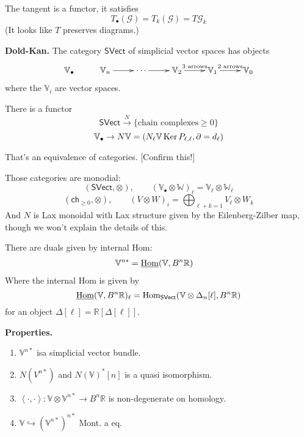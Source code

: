 {\medskip\noindent
The tangent is a functor, it satisfies
$$
T_\bullet(\mathcal{G})=T_k(\mathcal{G})=T\mathcal{G}_k
$$
(It looks like $T$ preserves diagrams.)

\medskip\noindent
{\bf Dold-Kan.} The category $\mathsf{SVect}$ of simplicial vector spaces
has objects
$$
\xymatrix{
\mathbb{V}_\bullet&  \mathbb{V}_n\ar[r]&\cdots
\ar[r]&\mathbb{V}_2\ar[r]^{\text{3 arrows}}&
\mathbb{V}_1\ar[r]^{\text{2 arrows}}&\mathbb{V}_0
}
$$
where the $\mathbb{V}_i$ are vector spaces.

There is a functor
$$
\mathsf{SVect}\overset{N}{\to}\{\text{chain complexes}\geq 0\}
$$
$$
\mathbb{V}_{\bullet}\to N\mathbb{V}=
\left(N_\ell \mathbb{V}\mathop{\mathrm{Ker}} P_{\ell,\ell},\partial=d_\ell\right)
$$

\begin{theorem}
\label{theorem-Dold-Kan}
That's an equivalence of categories. [Confirm this!]
\end{theorem}

Those categories are monodial:
$$
(\mathsf{SVect},\otimes),\qquad  (\mathbb{V}_\bullet \otimes \mathbb{W})_\ell
=\mathbb{V}_\ell \otimes \mathbb{W}_\ell
$$
$$
(\mathsf{ch}_{\geq 0},\otimes),\qquad (V \otimes W)_i=
\bigoplus_{\ell +k=1}V_\ell \otimes W_k
$$
And $N$ is Lax monoidal with Lax structure given by the
Eilenberg-Zilber map, though we won't explain the details of this.

There are duals given by internal Hom:
\begin{align*}
\mathbb{V}^{n*}&=\underline{\mathop{\mathrm{Hom}}\nolimits}(\mathbb{V},B^n\mathbb{R})
\end{align*}
Where the internal Hom is given by
$$
\underline{\mathop{\mathrm{Hom}}\nolimits}(\mathbb{V},B^n\mathbb{R})_\ell
=\mathop{\mathrm{Hom}}\nolimits_{\mathsf{SVect}}(\mathbb{V}\otimes\Delta_n[\ell],B^n\mathbb{R})
$$
for an object $\Delta[\ell]=\mathbb{R}[\Delta[\ell]]$.


\medskip\noindent
{\bf Properties.}
\begin{enumerate}
\item $\mathbb{V}^{n*}$ isa simplicial vector bundle.
\item $N(V^{n*})$ and $N(\mathbb{V})^*[n]$ is a quasi isomorphism.
\item $\left<\cdot,\cdot\right>:\mathbb{V}\otimes \mathbb{V}^{n*}\to
B^n\mathbb{R}$ is non-degenerate on homology.
\item $\mathbb{V}\hookrightarrow (\mathbb{V}^{n*})^{n*}$ 
Mont. a eq.
\end{enumerate}

}
